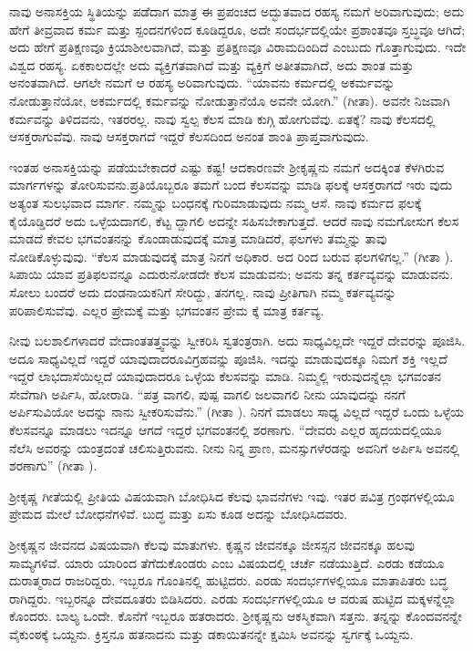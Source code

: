 ನಾವು ಅನಾಸಕ್ತಿಯ ಸ್ಥಿತಿಯನ್ನು ಪಡೆದಾಗ ಮಾತ್ರ ಈ ಪ್ರಪಂಚದ ಅದ್ಭುತವಾದ ರಹಸ್ಯ ನಮಗೆ ಅರಿವಾಗುವುದು; ಅದು ಹೇಗೆ ತೀವ್ರವಾದ ಕರ್ಮ ಮತ್ತು ಸ್ಪಂದನಗಳಿಂದ ಕೂಡಿದ್ದರೂ, ಅದೇ ಸಂದರ್ಭದಲ್ಲಿಯೇ ಪ್ರಶಾಂತವೂ ಸ್ತಬ್ಧವೂ ಆಗಿದೆ; ಅದು ಹೇಗೆ ಪ್ರತಿಕ್ಷಣವೂ ಕ್ರಿಯಾಶೀಲವಾಗಿದೆ, ಮತ್ತು ಪ್ರತಿಕ್ಷಣವೂ ವಿರಾಮದಿಂದಿದೆ ಎಂಬುದು ಗೊತ್ತಾಗುವುದು. ಇದೇ ವಿಶ್ವದ ರಹಸ್ಯ. ಏಕಕಾಲದಲ್ಲೇ ಅದು ವ್ಯಕ್ತಿಗತವಾಗಿದೆ ಮತ್ತು ವ್ಯಕ್ತಿಗೆ ಅತೀತವಾಗಿದೆ, ಅದು ಶಾಂತ ಮತ್ತು ಅನಂತವಾಗಿದೆ. ಆಗಲೇ ನಮಗೆ ಆ ರಹಸ್ಯ ಅರಿವಾಗುವುದು. “ಯಾವನು ಕರ್ಮದಲ್ಲಿ ಅಕರ್ಮವನ್ನು ನೋಡುತ್ತಾನೆಯೋ, ಅಕರ್ಮದಲ್ಲಿ ಕರ್ಮವನ್ನು ನೋಡುತ್ತಾನೆಯೊ ಅವನೇ ಯೋಗಿ.” (ಗೀತಾ). ಅವನೇ ನಿಜವಾಗಿ ಕರ್ಮವನ್ನು ತಿಳಿದವನು, ಇತರರಲ್ಲ. ನಾವು ಸ್ವಲ್ಪ ಕೆಲಸ ಮಾಡಿ ಕುಗ್ಗಿ ಹೋಗುವೆವು. ಏತಕ್ಕೆ? ನಾವು ಕೆಲಸದಲ್ಲಿ ಆಸಕ್ತರಾಗುವೆವು. ನಾವು ಆಸಕ್ತರಾಗದೆ ಇದ್ದರೆ ಕೆಲಸದಿಂದ ಅನಂತ ಶಾಂತಿ ಪ್ರಾಪ್ತವಾಗುವುದು.

ಇಂತಹ ಅನಾಸಕ್ತಿಯನ್ನು ಪಡೆಯಬೇಕಾದರೆ ಎಷ್ಟು ಕಷ್ಟ! ಆದಕಾರಣವೇ ಶ‍್ರೀಕೃಷ್ಣನು ನಮಗೆ ಅದಕ್ಕಿಂತ ಕೆಳಗಿರುವ ಮಾರ್ಗಗಳನ್ನು ತೋರಿಸುವನು.ಪ್ರತಿಯೊಬ್ಬರೂ ತಮಗೆ ಬಂದ ಕೆಲಸವನ್ನು ಮಾಡಿ ಫಲಕ್ಕೆ ಆಸಕ್ತರಾಗದೆ ಇರು ವುದು ಅತ್ಯಂತ ಸುಲಭವಾದ ಮಾರ್ಗ. ನಮ್ಮನ್ನು ಬಂಧನಕ್ಕೆ ಗುರಿಮಾಡುವುದು ನಮ್ಮ ಆಸೆ. ನಾವು ಕರ್ಮದ ಫಲಕ್ಕೆ ಕೈಯೊಡ್ಡಿದರೆ ಅದು ಒಳ್ಳೆಯದಾಗಲಿ, ಕೆಟ್ಟ ದ್ದಾಗಲಿ ಅದನ್ನೇ ಸಹಿಸಬೇಕಾಗುತ್ತದೆ. ಆದರೆ ನಾವು ನಮಗೋಸುಗ ಕೆಲಸ ಮಾಡದೆ ಕೇವಲ ಭಗವಂತನನ್ನು ಕೊಂಡಾಡುವುದಕ್ಕೆ ಮಾತ್ರ ಮಾಡಿದರೆ, ಫಲಗಳು ತಮ್ಮನ್ನು ತಾವು ನೋಡಿಕೊಳ್ಳುವುವು. “ಕೆಲಸ ಮಾಡುವುದಕ್ಕೆ ಮಾತ್ರ ನಿನಗೆ ಅಧಿಕಾರ. ಅದ ರಿಂದ ಬರುವ ಫಲಗಳಿಗಲ್ಲ.” (ಗೀತಾ ). ಸಿಪಾಯಿ ಯಾವ ಪ್ರತಿಫಲವನ್ನೂ ಎದುರುನೋಡದೇ ಕೆಲಸ ಮಾಡುವನು; ಅವನು ತನ್ನ ಕರ್ತವ್ಯವನ್ನು ಮಾಡುವನು. ಸೋಲು ಬಂದರೆ ಅದು ದಂಡನಾಯಕನಿಗೆ ಸೇರಿದ್ದು, ತನಗಲ್ಲ. ನಾವು ಪ್ರೀತಿಗಾಗಿ ನಮ್ಮ ಕರ್ತವ್ಯವನ್ನು ಪರಿಪಾಲಿಸುವೆವು. ಎಲ್ಲರ ಪ್ರೇಮಕ್ಕೆ ಮತ್ತು ಭಗವಂತನ ಪ್ರೇಮ ಕ್ಕೆ ಮಾತ್ರ ಕರ್ತವ್ಯ.

ನೀವು ಬಲಶಾಲಿಗಳಾದರೆ ವೇದಾಂತತತ್ತ್ವವನ್ನು ಸ್ವೀಕರಿಸಿ ಸ್ವತಂತ್ರರಾಗಿ. ಅದು ಸಾಧ್ಯವಿಲ್ಲದೇ ಇದ್ದರೆ ದೇವರನ್ನು ಪೂಜಿಸಿ. ಅದೂ ಸಾಧ್ಯವಿಲ್ಲದೆ ಇದ್ದರೆ ಯಾವುದಾದರೂ\break ವಿಗ್ರಹವನ್ನು ಪೂಜಿಸಿ. ಇದನ್ನು ಮಾಡುವುದಕ್ಕೂ ನಿಮಗೆ ಶಕ್ತಿ ಇಲ್ಲದೆ ಇದ್ದರೆ ಲಾಭದಾಸೆಯಿಲ್ಲದೆ ಯಾವುದಾದರೂ ಒಳ್ಳೆಯ ಕೆಲಸವನ್ನು ಮಾಡಿ. ನಿಮ್ಮಲ್ಲಿ ಇರುವುದನ್ನೆಲ್ಲಾ ಭಗವಂತನ ಸೇವೆಗಾಗಿ ಅರ್ಪಿಸಿ, ಹೋರಾಡಿ. “ಪತ್ರ ವಾಗಲಿ, ಪುಷ್ಪ ವಾಗಲಿ ಜಲವಾಗಲಿ ನೀನು ಯಾವುದನ್ನು ನನಗೆ ಅರ್ಪಿಸುವಿಯೋ ಅದನ್ನು ನಾನು ಸ್ವೀಕರಿಸುವೆನು.” (ಗೀತಾ ). ನಿನಗೆ ಮಾಡಲು ಸಾಧ್ಯ ವಿಲ್ಲದೆ ಇದ್ದರೆ ಒಂದು ಒಳ್ಳೆಯ ಕೆಲಸವನ್ನೂ ಮಾಡಲು ಇದನ್ನೂ ಆಗದೆ ಇದ್ದರೆ ಭಗವಂತನಲ್ಲಿ ಶರಣಾಗು. “ದೇವರು ಎಲ್ಲರ ಹೃದಯದಲ್ಲಿಯೂ ನೆಲೆಸಿ ಅವರನ್ನು ಯಂತ್ರದಂತೆ ಚಲಿಸುತ್ತಿರುವನು. ನೀನು ನಿನ್ನ ಪ್ರಾಣ, ಮನಸ್ಸುಗಳೆರಡನ್ನು ಅವನಿಗೆ ಅರ್ಪಿಸಿ ಅವನಲ್ಲಿ ಶರಣಾಗು” (ಗೀತಾ ).

ಶ‍್ರೀಕೃಷ್ಣ ಗೀತೆಯಲ್ಲಿ ಪ್ರೀತಿಯ ವಿಷಯವಾಗಿ ಬೋಧಿಸಿದ ಕೆಲವು ಭಾವನೆಗಳು ಇವು. ಇತರ ಪವಿತ್ರ ಗ್ರಂಥಗಳಲ್ಲಿಯೂ ಪ್ರೇಮದ ಮೇಲೆ ಬೋಧನೆಗಳಿವೆ. ಬುದ್ಧ ಮತ್ತು ಏಸು ಕೂಡ ಅದನ್ನು ಬೋಧಿಸಿದವರು.

ಶ‍್ರೀಕೃಷ್ಣನ ಜೀವನದ ವಿಷಯವಾಗಿ ಕೆಲವು ಮಾತುಗಳು. ಕೃಷ್ಣನ ಜೀವನಕ್ಕೂ ಜೀಸಸ್ಸನ ಜೀವನಕ್ಕೂ ಹಲವು ಸಾಮ್ಯಗಳಿವೆ. ಯಾರು ಯಾರಿಂದ ತೆಗೆದುಕೊಂಡರು ಎಂಬ ವಿಷಯದಲ್ಲಿ ಚರ್ಚೆ ನಡೆಯುತ್ತಿದೆ. ಎರಡು ಕಡೆಯೂ ದುರಾತ್ಮರಾದ ರಾಜರಿದ್ದರು. ಇಬ್ಬರೂ ಗೊಂತಿನಲ್ಲಿ ಹುಟ್ಟಿದರು. ಎರಡು ಸಂದರ್ಭಗಳಲ್ಲಿಯೂ ಮಾತಾಪಿತರು ಬದ್ಧ ರಾಗಿದ್ದರು. ಇಬ್ಬರನ್ನೂ ದೇವದೂತರು ಬಿಡಿಸಿದರು. ಎರಡು ಸಂದರ್ಭಗಳಲ್ಲಿಯೂ ಆ ವರುಷ ಹುಟ್ಟಿದ ಮಕ್ಕಳನ್ನೆಲ್ಲಾ ಕೊಂದರು. ಬಾಲ್ಯ ಒಂದೇ. ಕೊನೆಗೆ ಇಬ್ಬರೂ ಹತರಾದರು. ಶ‍್ರೀಕೃಷ್ಣನು ಆಕಸ್ಮಿಕವಾಗಿ ಸತ್ತನು. ತನ್ನನ್ನು ಕೊಂದವನನ್ನೇ ವೈಕುಂಠಕ್ಕೆ ಒಯ್ದನು. ಕ್ರಿಸ್ತನೂ ಹತನಾದನು ಮತ್ತು ಡಕಾಯಿತನನ್ನೇ ಕ್ಷಮಿಸಿ ಅವನನ್ನು ಸ್ವರ್ಗಕ್ಕೆ ಒಯ್ದನು.

